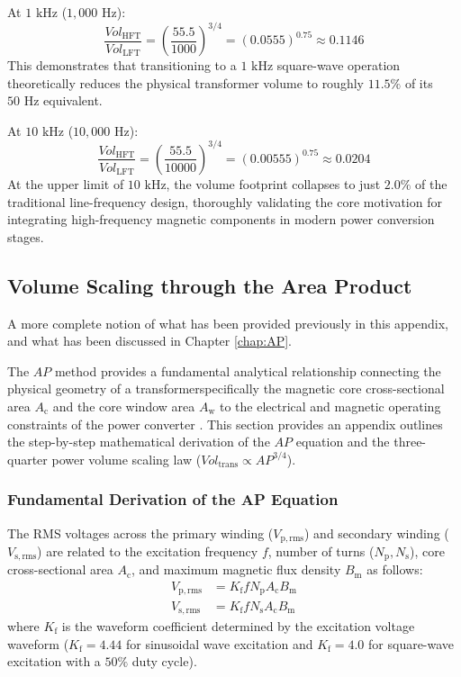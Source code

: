 At $1 \text{ kHz}$ ($1,000 \text{ Hz}$):
$$ \frac{Vol_{\mathrm{HFT}}}{Vol_{\mathrm{LFT}}} = \left( \frac{55.5}{1000} \right)^{3/4} = (0.0555)^{0.75} \approx 0.1146 $$
This demonstrates that transitioning to a $1 \text{ kHz}$ square-wave operation theoretically reduces the physical transformer volume to roughly $11.5\%$ of its $50 \text{ Hz}$ equivalent. 

At $10 \text{ kHz}$ ($10,000 \text{ Hz}$):
$$ \frac{Vol_{\mathrm{HFT}}}{Vol_{\mathrm{LFT}}} = \left( \frac{55.5}{10000} \right)^{3/4} = (0.00555)^{0.75} \approx 0.0204 $$
At the upper limit of $10 \text{ kHz}$, the volume footprint collapses to just $2.0\%$ of the traditional line-frequency design, thoroughly validating the core motivation for integrating high-frequency magnetic components in modern power conversion stages.

\subsection*{Volume Scaling through the Area Product}
A more complete notion of what has been provided previously in this appendix, and what has been discussed in Chapter \ref{chap:AP}.

The $AP$ method provides a fundamental analytical relationship connecting the physical geometry of a transformerspecifically the magnetic core cross-sectional area $A_{\mathrm{c}}$ and the core window area $A_{\mathrm{w}}$ to the electrical and magnetic operating constraints of the power converter \cite{Kimura2015, Colonel2004} . This section provides an appendix outlines the step-by-step mathematical derivation of the $AP$ equation and the three-quarter power volume scaling law ($Vol_{\mathrm{trans}} \propto AP^{3/4}$).

\subsubsection*{Fundamental Derivation of the AP  Equation}
The RMS voltages across the primary winding ($V_{\mathrm{p,rms}}$) and secondary winding ($V_{\mathrm{s,rms}}$) are related to the excitation frequency $f$, number of turns ($N_{\mathrm{p}}, N_{\mathrm{s}}$), core cross-sectional area $A_{\mathrm{c}}$, and maximum magnetic flux density $B_{\mathrm{m}}$ as follows:
\begin{align}
    V_{\mathrm{p,rms}} &= K_{\mathrm{f}} f N_{\mathrm{p}} A_{\mathrm{c}} B_{\mathrm{m}}\label{eq:app_faraday_p} \\
    V_{\mathrm{s,rms}} &= K_{\mathrm{f}} f N_{\mathrm{s}} A_{\mathrm{c}} B_{\mathrm{m}}\label{eq:app_faraday_s}
\end{align}
where $K_{\mathrm{f}}$ is the waveform coefficient determined by the excitation voltage waveform ($K_{\mathrm{f}} = 4.44$ for sinusoidal wave excitation and $K_{\mathrm{f}} = 4.0$ for square-wave excitation with a $50\%$ duty cycle).

